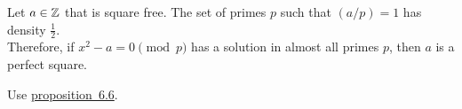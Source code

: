 \documentclass[15pt]{scrartcl}
\begin{document}
\begin{corollary}
    Let $a\in \mathbb Z$ that is square free. The set of primes $p$ such that $(a/p)=1$ has density $\frac{1}{2}$. 
    \\
    
    Therefore, if $x^2-a=0 \pmod p$ has a solution in almost all primes $p$, then $a$ is a perfect square.
\end{corollary}
Use \hyperref[prop:6.6]{proposition~6.6}. 
\end{document}
